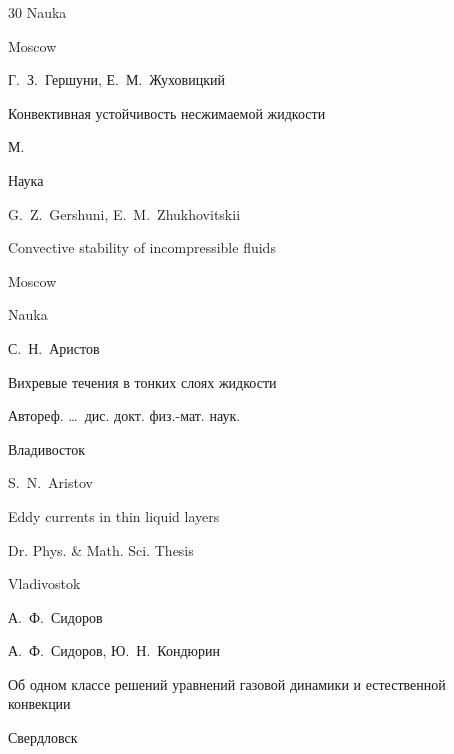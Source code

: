 {\begin{thebibliography}{30}
\publ Nauka

\publaddr Moscow








\by Г.~З.~Гершуни, Е.~М.~Жуховицкий

\book Конвективная устойчивость несжимаемой жидкости

\publaddr М.

\publ Наука



\misctransl

\by G.~Z.~Gershuni, E.~M.~Zhukhovitskii 

\book Convective stability of incompressible fluids

\publaddr Moscow

\publ Nauka






\by С.~Н.~Аристов

\thesis Вихревые течения в тонких слоях жидкости

\thesisinfo Автореф. \dots\ дис. докт. физ.-мат. наук.

\publaddr Владивосток



\misctransl

\by S.~N.~Aristov

\thesis Eddy currents in thin liquid layers

\thesisinfo Dr. Phys. \& Math. Sci. Thesis

\publaddr Vladivostok






\by А.~Ф.~Сидоров

\ed А.~Ф.~Сидоров, Ю.~Н.~Кондюрин

\paper  Об одном классе решений уравнений газовой динамики и естественной конвекции

\publaddr Свердловск


\end{thebibliography}}
